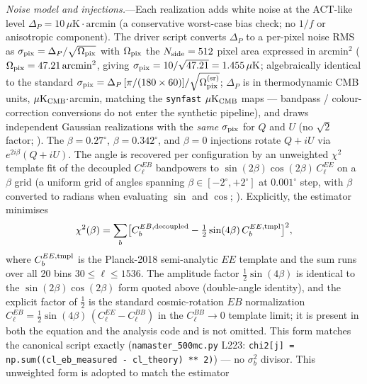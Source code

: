 \documentclass[aps,prd,twocolumn,superscriptaddress,showpacs,preprintnumbers,nofootinbib,longbibliography,floatfix]{revtex4-2}
\begin{document}
\emph{Noise model and injections.}---Each realization adds white noise at
the ACT-like level $\Delta_P=10\,\mu\text{K}\cdot\text{arcmin}$ (a
conservative worst-case bias check; no $1/f$ or anisotropic component).
The driver script converts $\Delta_P$ to a per-pixel noise RMS as
$\sigma_{\rm pix} = \Delta_P/\sqrt{\Omega_{\rm pix}}$ with
$\Omega_{\rm pix}$ the $N_{\rm side}=512$ pixel area expressed in
arcmin$^2$ ($\Omega_{\rm pix} = 47.21\,\text{arcmin}^2$, giving
$\sigma_{\rm pix} = 10/\sqrt{47.21} = 1.455\,\mu\text{K}$; algebraically
identical to the standard
$\sigma_{\rm pix}=\Delta_P\,[\pi/(180\times 60)]/\sqrt{\Omega_{\rm pix}^{\rm (sr)}}$;
$\Delta_P$ is in thermodynamic CMB units, $\mu\text{K}_{\rm CMB}\cdot$arcmin,
matching the \texttt{synfast} $\mu\text{K}_{\rm CMB}$ maps --- bandpass /
colour-correction conversions do not enter the synthetic pipeline),
and draws independent Gaussian realizations with the \emph{same}
$\sigma_{\rm pix}$ for $Q$ and $U$ (no $\sqrt{2}$ factor;
).
The $\beta=0.27^\circ$,
$\beta=0.342^\circ$, and $\beta=0$ injections rotate $Q+iU$ via
$e^{2i\beta}(Q+iU)$. The angle is recovered per configuration by an
unweighted $\chi^2$ template fit of the decoupled $C_\ell^{EB}$ bandpowers
to $\sin(2\beta)\cos(2\beta)\,C_\ell^{EE}$ on a $\beta$ grid
(a uniform grid of angles spanning $\beta\in[-2^\circ,+2^\circ]$ at $0.001^\circ$ step,
with $\beta$ converted to radians when evaluating $\sin$ and $\cos$;
).
Explicitly, the estimator minimises
\begin{equation}\label{eq:chi2_beta}
\chi^2(\beta) = \sum_b
\bigl[C_b^{EB,\rm decoupled} - \tfrac{1}{2}\sin(4\beta)\,C_b^{EE,\rm tmpl}\bigr]^2,
\end{equation}
where $C_b^{EE,\rm tmpl}$ is the Planck-2018 semi-analytic $EE$ template and the sum
runs over all 20 bins $30\!\le\!\ell\!\le\!1536$. The amplitude factor
$\tfrac{1}{2}\sin(4\beta)$ is identical to the $\sin(2\beta)\cos(2\beta)$ form
quoted above (double-angle identity), and the explicit factor of $\tfrac{1}{2}$
is the standard cosmic-rotation $EB$ normalization
$C_\ell^{EB}=\tfrac{1}{2}\sin(4\beta)\,(C_\ell^{EE}-C_\ell^{BB})$ in the
$C_\ell^{BB}\!\to\!0$ template limit; it is present in both the equation and the
analysis code and is not omitted.
This form matches the canonical script exactly (\texttt{namaster\_500mc.py} L223:
\texttt{chi2[j] = np.sum((cl\_eb\_measured - cl\_theory) ** 2)}) --- no
$\sigma_b^2$ divisor. This unweighted form is adopted to match the estimator
\end{document}
